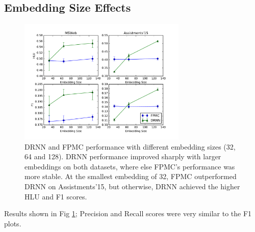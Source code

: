 \documentclass{sig-alternate-05-2015}
\begin{document}
\subsection{Embedding Size Effects}
\begin{figure}
\centering
\includegraphics[width=8cm]{images/EmbPerf}		
\caption{DRNN and FPMC performance with different embedding sizes (32, 64 and 128). DRNN performance improved sharply with larger embeddings on both datasets, where else FPMC's performance was more stable. At the smallest embedding of 32, FPMC outperformed DRNN on Assistments'15, but otherwise, DRNN achieved the higher HLU and F1 scores.}
\label{fig:EmbResults}
\end{figure}


Results shown in Fig \ref{fig:EmbResults}; Precision and Recall scores were very similar to the F1 plots. 
\end{document}
